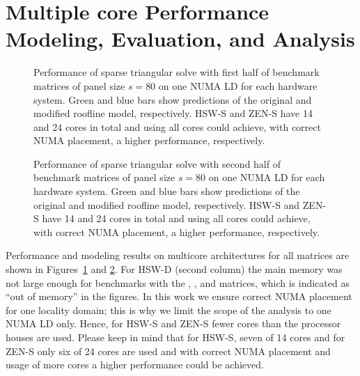 
\section{Multiple core Performance Modeling, Evaluation, and Analysis}
\label{sec:performance:multicore}

\begin{figure}[tp]%
  \centering%
  \begin{adjustbox}{angle=90}
  \end{adjustbox}
  \caption{Performance of sparse triangular solve with first half of benchmark matrices of
panel size $s=80$ on one NUMA LD for each hardware system.
  Green and blue bars show predictions of the original and modified roofline
model, respectively.
  HSW-S and ZEN-S have 14 and 24 cores in total and using all cores could
achieve, with correct NUMA placement, a higher performance, respectively.}
  \label{fig:p:pardiso-1}
\end{figure}

\begin{figure}[tp]%
  \centering%
  \begin{adjustbox}{angle=90}
  \end{adjustbox}
  \caption{Performance of sparse triangular solve with second half of benchmark matrices of
panel size $s=80$ on one NUMA LD for each hardware system.
  Green and blue bars show predictions of the original and modified roofline
model, respectively.
  HSW-S and ZEN-S have 14 and 24 cores in total and using all cores could
achieve, with correct NUMA placement, a higher performance, respectively.}
  \label{fig:p:pardiso-2}
\end{figure}

Performance and modeling results on multicore architectures for all matrices are shown in Figures~\ref{fig:p:pardiso-1} and \ref{fig:p:pardiso-2}.
For HSW-D (second column) the main memory was not large enough for benchmarks
with the , , and  matrices, which is
indicated as ``out of memory'' in the figures.
%
%
In this work we ensure correct NUMA placement for one locality domain; this is why
we limit the scope of the analysis to one NUMA LD only. 
Hence, for HSW-S and ZEN-S fewer cores than the processor houses are used.
Please keep in mind that for HSW-S, seven of 14 cores and for ZEN-S only six of
24 cores are used and with correct NUMA placement and usage of more cores a
higher performance could be achieved.

